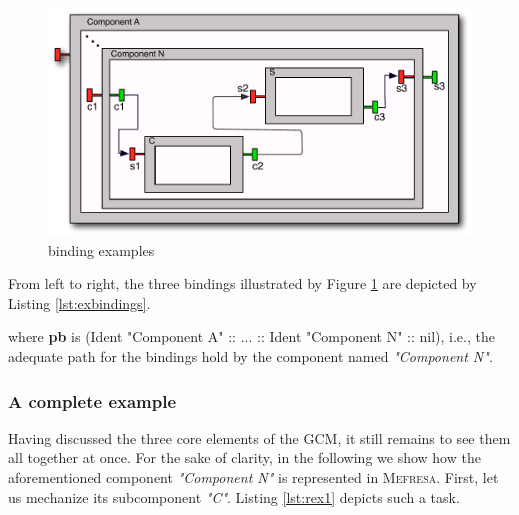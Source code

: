 	\begin{figure}[H]
		 \centering
		\includegraphics[scale=0.7]{figures/chapter4/bindings.pdf}
		\caption{\textsf{binding} examples}
		\label{fig:bindingsdemo}		
	\end{figure}		

	\noindent From left to right, the three bindings illustrated by Figure \ref{fig:bindingsdemo} are depicted by
	Listing \ref{lst:exbindings}.

	

	\noindent where \textbf{pb} is \textsf{(Ident "Component A" :: ... :: Ident "Component N" :: nil)}, i.e., the adequate 
	\textsf{path} for the bindings hold by the \textsf{component} named \textit{"Component N"}.


	
\subsubsection{A complete example}
		
				
		Having discussed the three core elements of the \ac{GCM}, it still remains to see them all together at once.
	For the sake of clarity, in the following we show how the aforementioned
	\textsf{component} \textit{"Component N"} is represented in \textsc{Mefresa}. First, let us
	 mechanize its subcomponent \textit{"C"}. Listing \ref{lst:rex1} depicts such a task.
		
	
	
